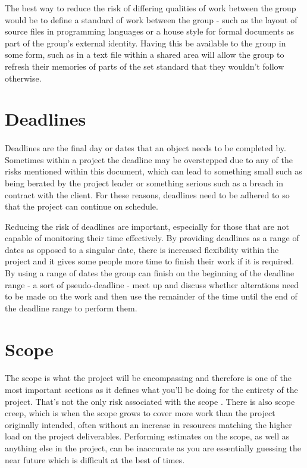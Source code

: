 The best way to reduce the risk of differing qualities of work between the group
would be to define a standard of work between the group - such as the layout of
source files in programming languages or a house style for formal documents as
part of the group's external identity.  Having this be available to the group in
some form, such as in a text file within a shared area will allow the group to
refresh their memories of parts of the set standard that they wouldn't follow
otherwise.

\section{Deadlines}
\paragraph{}

Deadlines are the final day or dates that an object needs to be completed by.
Sometimes within a project the deadline may be overstepped due to any of the
risks mentioned within this document, which can lead to something small such as
being berated by the project leader or something serious such as a breach in
contract with the client.  For these reasons, deadlines need to be adhered to
so that the project can continue on schedule.

Reducing the risk of deadlines are important, especially for those that are not
capable of monitoring their time effectively.  By providing deadlines as a range
of dates as opposed to a singular date, there is increased flexibility within
the project and it gives some people more time to finish their work if it is
required.  By using a range of dates the group can finish on the beginning of
the deadline range - a sort of pseudo-deadline - meet up and discuss whether
alterations need to be made on the work and then use the remainder of the time
until the end of the deadline range to perform them.

\section{Scope}
\paragraph{}

The scope is what the project will be encompassing and therefore is one of the
most important sections as it defines what you'll be doing for the entirety of
the project.  That's not the only risk associated with the scope 
\cite{RiskList}.
There is also scope creep, which is when the scope grows to cover more work than
the project originally intended, often without an increase in resources matching
the higher load on the project deliverables.  Performing estimates on the scope,
as well as anything else in the project, can be inaccurate as you are
essentially guessing the near future which is difficult at the best of times.

